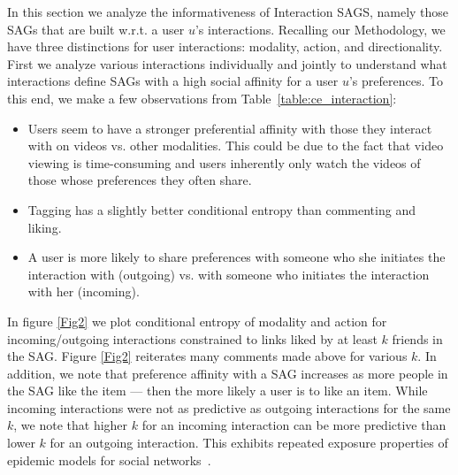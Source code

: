 In this section we analyze the informativeness of Interaction SAGS,
namely those SAGs that are built w.r.t. a user $u$'s interactions.
Recalling our Methodology, we have three distinctions for user
interactions: modality, action, and directionality.  First we analyze
various interactions individually and jointly to understand what
interactions define SAGs with a high social affinity for a user $u$'s
preferences.  To this end, we make a few observations from
Table~\ref{table:ce_interaction}:
\begin{itemize}
\item Users seem to have a stronger preferential affinity with
those they interact with on videos vs. other modalities.  This could
be due to the fact that video viewing is time-consuming and users
inherently only watch the videos of those whose preferences they
often share.
\item Tagging has a slightly better conditional entropy than commenting
and liking.%
\item A user is more likely to share preferences with someone who she
initiates the interaction with (outgoing) vs. with someone who initiates
the interaction with her (incoming).~\cite{saez2011high}
\end{itemize}

In figure \ref{Fig2} we plot conditional entropy of modality and
action for incoming/outgoing interactions constrained to links
liked by at least $k$ friends in the SAG.  Figure \ref{Fig2} reiterates
many comments made above for various $k$.  In addition, we note that
preference affinity with a SAG increases as more people in the SAG
like the item --- then the more likely a user is to like an item.
While incoming interactions were not as predictive as outgoing
interactions for the same $k$, we note that higher $k$ for an incoming
interaction can be more predictive than lower $k$ for an outgoing
interaction.  This exhibits repeated exposure properties of epidemic
models for social networks~\cite{Golub2010selectionbiase}.


